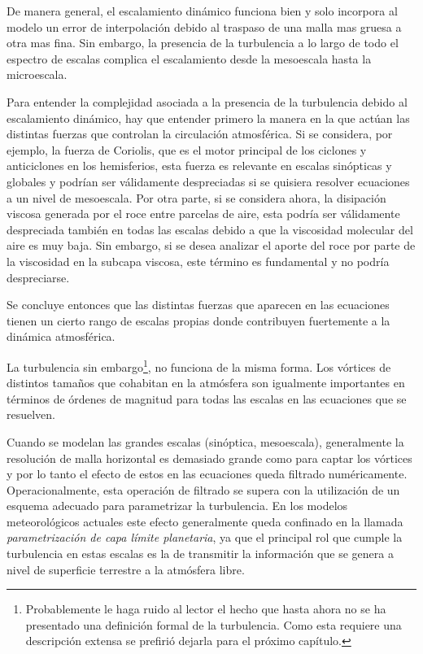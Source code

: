 De manera general, el escalamiento dinámico funciona bien y solo incorpora al modelo un error de interpolación debido al traspaso de una malla mas gruesa a otra mas fina. Sin embargo, la presencia de la turbulencia a lo largo de todo el espectro de escalas complica el escalamiento desde la mesoescala hasta la microescala.

Para entender la complejidad asociada a la presencia de la turbulencia debido al escalamiento dinámico, hay que entender primero la manera en la que actúan las distintas fuerzas que controlan la circulación atmosférica. Si se considera, por ejemplo, la fuerza de Coriolis, que es el motor principal de los ciclones y anticiclones en los hemisferios, esta fuerza es relevante en escalas sinópticas y globales y  podrían ser válidamente despreciadas si se quisiera resolver ecuaciones a un nivel de mesoescala. Por otra parte, si se considera ahora, la disipación viscosa generada por el roce entre parcelas de aire, esta podría ser válidamente despreciada también en todas las escalas debido a que la viscosidad molecular del aire es muy baja. Sin embargo, si se desea analizar el aporte del roce por parte de la viscosidad en la subcapa viscosa, este término es fundamental y no podría despreciarse. 

Se concluye entonces que las distintas fuerzas que aparecen en las ecuaciones tienen un cierto rango de escalas propias donde contribuyen fuertemente a la dinámica atmosférica. 

La turbulencia sin embargo\footnote{Probablemente le haga ruido al lector el hecho que hasta ahora no se ha presentado una definición formal de la turbulencia. Como esta requiere una descripción extensa se prefirió dejarla para el próximo capítulo.}, no funciona de la misma forma. Los vórtices de distintos tamaños que cohabitan en la atmósfera son igualmente importantes en términos de órdenes de magnitud para todas las escalas en las ecuaciones que se resuelven.

Cuando se modelan las grandes escalas (sinóptica, mesoescala), generalmente la resolución de malla horizontal es demasiado grande como para captar los vórtices y por lo tanto el efecto de estos en las ecuaciones queda filtrado numéricamente. Operacionalmente, esta operación de filtrado se supera con la utilización de un esquema adecuado para parametrizar la turbulencia. En los modelos meteorológicos actuales este efecto generalmente queda confinado en la llamada \emph{parametrización de capa límite planetaria}, ya que el principal rol que cumple la turbulencia en estas escalas es la de transmitir la información que se genera a nivel de superficie terrestre a la atmósfera libre.

